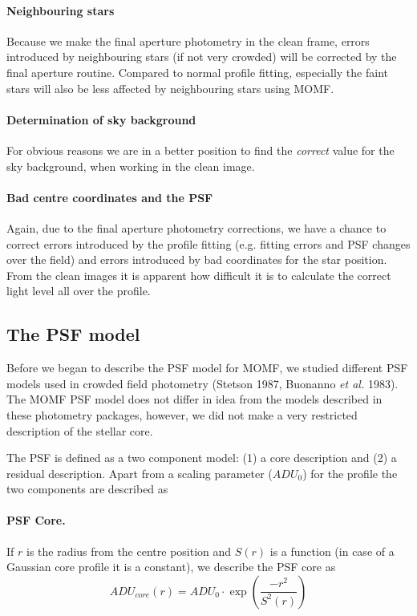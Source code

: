 \documentclass[]{article}
\begin{document}
\paragraph{Neighbouring stars}
Because we make the final aperture photometry in
the clean frame, errors introduced by neighbouring stars (if
not very crowded) will be corrected by the final aperture routine.
Compared to normal profile fitting, especially the faint stars will
also be less affected by neighbouring stars using MOMF.
\paragraph{Determination of sky background}
For obvious reasons we are in a better position to find the {\em
correct} value for the sky background, when working in the clean
image.
\paragraph{Bad centre coordinates and the PSF}
Again, due to the final aperture photometry corrections, we have
a chance to correct errors introduced by the profile fitting 
(e.g. fitting errors and PSF changes over the field) and
errors introduced by
bad coordinates for the star position. From the clean images 
it is apparent
how difficult it is to
calculate the correct light level all over the profile.

\subsection{The PSF model}
Before we began to describe the PSF model for MOMF, we studied
different PSF models used in crowded field photometry (Stetson 
1987,
Buonanno {\em et al.} 1983). The MOMF PSF model does not
differ in idea from the models described in these photometry 
packages,
however, we did not make a very restricted description of the stellar 
core.
 
The PSF is defined as a two component model: (1) a core description
and (2) a residual description. Apart from a scaling parameter 
($ADU_{0}$)
for the profile the two components are described as
\paragraph{PSF Core.}
If $r$ is the radius from the centre position and $S(r)$ is a
function (in case of a Gaussian core profile it is a constant), we
describe the PSF core as
\begin{equation}
ADU_{core} (r) = ADU_{0} \cdot \exp ( \frac {-r ^{2} }{S^{2} (r) } )
\end{equation}
\end{document}

